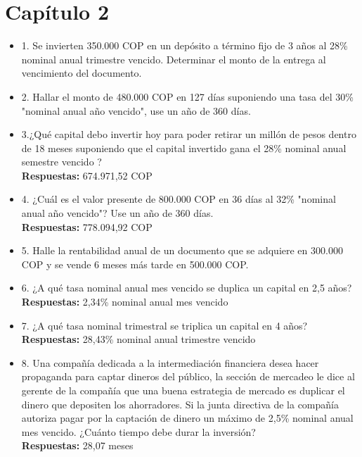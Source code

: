 \chapter*{Capítulo 2}


\begin{itemize}

 \item 1.	Se invierten 350.000 COP en un depósito a término fijo de 3 años al 28\% nominal anual trimestre vencido. Determinar el monto de la entrega al vencimiento del documento.  \\
       \medskip

 \item 2. Hallar el monto de 480.000 COP en 127 días suponiendo una tasa del 30\% "nominal anual año vencido", use un año de 360 días.\\
       \medskip

 \item 3.¿Qué capital debo invertir hoy para poder retirar un millón de pesos dentro de 18 meses suponiendo que el capital invertido gana el 28\%  nominal anual semestre vencido ?\\

       \textbf{Respuestas:}  674.971,52 COP
       \medskip

 \item 4. ¿Cuál es el valor presente de 800.000 COP en 36 días al 32\% "nominal anual año vencido"? Use un año de 360 días.\\
       \textbf{Respuestas:}  778.094,92 COP
       \medskip

 \item 5. Halle la rentabilidad anual de un documento que se adquiere en 300.000 COP y se vende 6 meses más tarde en 500.000 COP. \\
       \medskip

 \item 6. ¿A qué tasa nominal anual mes vencido se duplica un capital en 2,5 años?  \\
       \textbf{Respuestas:} 2,34\% nominal anual mes vencido
       \medskip

 \item 7. ¿A qué tasa nominal trimestral se triplica un capital en 4 años?\\
       \textbf{Respuestas:} 28,43\% nominal anual trimestre vencido
       \medskip

 \item 8. Una compañía dedicada a la intermediación financiera desea hacer propaganda para captar dineros del público, la sección de mercadeo le dice al gerente de la compañía que una buena estrategia de mercado es duplicar el dinero que depositen los ahorradores. Si la junta directiva de la compañía autoriza pagar por la captación de dinero un máximo de 2,5\% nominal anual mes vencido. ¿Cuánto tiempo debe durar la inversión?  \\
       \textbf{Respuestas:} 28,07 meses
       \medskip


\end{itemize}
